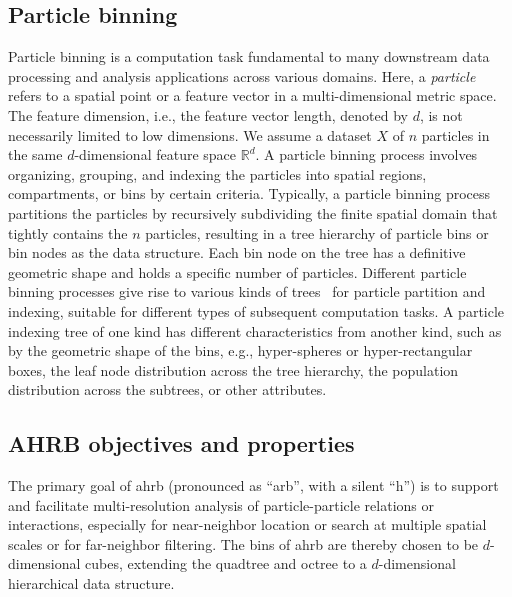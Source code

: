 \documentclass[final]{juliacon}
\begin{document}
%
%
%
%
%
%
%

\subsection{Particle binning}
\label{sec:problem-description}

%

Particle binning is a computation task fundamental to many downstream data
processing and analysis applications across various domains.  Here, a {\em
particle} refers to a spatial point or a feature vector in a
multi-dimensional metric space. The feature dimension, i.e., the feature vector
length, denoted by $d$, is not necessarily limited to low dimensions. We assume
a dataset $X$ of $n$ particles in the same $d$-dimensional feature space
$\mathbb{R}^d$. A particle binning process involves organizing, grouping, and
indexing the particles into spatial regions, compartments, or bins by certain
criteria. Typically, a particle binning process partitions the particles
by recursively subdividing the finite spatial domain that tightly contains the
$n$ particles, resulting in a tree hierarchy of particle bins or bin nodes as
the data structure.  Each bin node on the tree has a definitive geometric shape
and holds a specific number of particles. Different particle binning processes
give rise to various kinds of
trees~\cite{bayer1970,bentley1975a,guttman1984,beckmann1990,yianilos1993}  for
particle partition and indexing, suitable for different types of subsequent
computation tasks. A particle indexing tree of one kind has different
characteristics from another kind, such as by the geometric shape of the bins,
e.g., hyper-spheres or hyper-rectangular boxes, the leaf node distribution
across the tree hierarchy, the population distribution across the subtrees, or
other attributes.

\vspace{3pt}

%

\subsection{AHRB objectives and properties}
\label{sec:ahrb-objectives}

The primary goal of {\sc ahrb} (pronounced as ``arb'', with a silent ``h'') is
to support and facilitate multi-resolution analysis of particle-particle
relations or interactions, especially for near-neighbor location or search at
multiple spatial scales or for far-neighbor filtering. The bins of {\sc ahrb}
are thereby chosen to be $d$-dimensional cubes, extending the quadtree and octree to a $d$-dimensional hierarchical data structure.
%
\end{document}
